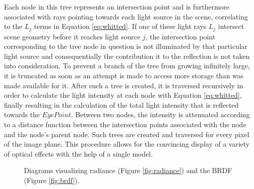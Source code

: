 Each node in this tree represents an intersection point and is furthermore associated with rays pointing towards  each light source in the scene, correlating to the $L_{j}$ terms in Equation \ref{eq:whitted}. If one of these light rays $L_{j}$ intersect scene geometry before it reaches light source $j$, the intersection point corresponding to the tree node in question is not illuminated by that particular light source and consequentially the contribution it to the reflection is not taken into consideration. To prevent a branch of the tree from growing infinitely large, it is truncated as soon as an attempt is made to access more storage than was made available for it. After such a tree is created, it is traversed recursively in order to calculate the light intensity at each node with Equation \ref{eq:whitted}, finally resulting in the calculation of the total light intensity that is reflected towards the $Eye Point$. Between two nodes, the intensity is attenuated according to a distance function between the intersection points associated with the node and the node's parent node. 
Such trees are created and traversed for every pixel of the image plane. This procedure allows for the convincing display of a variety of optical effects with the help of a single model.


\begin{figure}
	\centering
	\hfill
	\caption{Diagrams visualizing radiance (Figure \ref{fig:radiance}) and the BRDF (Figure \ref{fig:brdf}).}
\end{figure}

